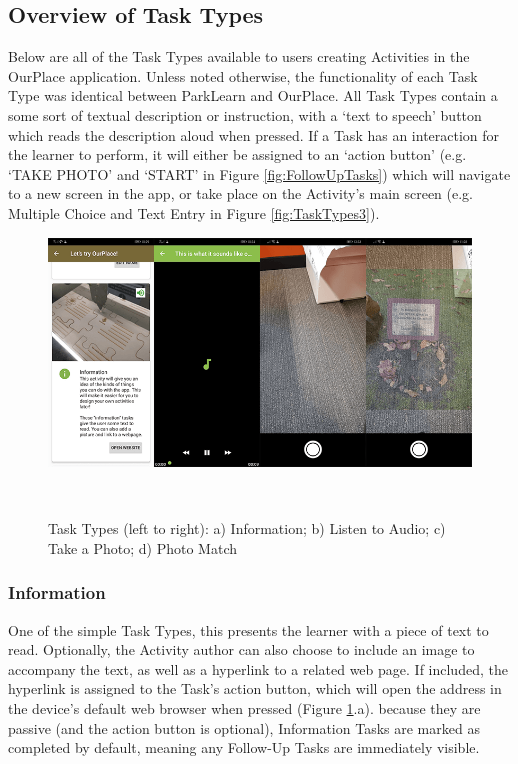 \subsection{Overview of Task Types}
\label{sec:TaskTypes}
Below are all of the Task Types available to users creating Activities in the OurPlace application. Unless noted otherwise, the functionality of each Task Type was identical between ParkLearn and OurPlace. All Task Types contain a some sort of textual description or instruction, with a `text to speech' button which reads the description aloud when pressed. If a Task has an interaction for the learner to perform, it will either be assigned to an `action button' (e.g. `TAKE PHOTO' and `START' in Figure \ref{fig:FollowUpTasks}) which will navigate to a new screen in the app, or take place on the Activity's main screen (e.g. Multiple Choice and Text Entry in Figure \ref{fig:TaskTypes3}). 

\begin{figure}
  \centering
  \includegraphics[width=1\columnwidth]{images/chapter05/tasktypes1.png}
  \caption[Task Types (part 1)]{Task Types (left to right): a) Information; b) Listen to Audio; c) Take a Photo; d) Photo Match}~\label{fig:TaskTypes1}
\end{figure}

\subsubsection*{Information}
One of the simple Task Types, this presents the learner with a piece of text to read. Optionally, the Activity author can also choose to include an image to accompany the text, as well as a hyperlink to a related web page. If included, the hyperlink is assigned to the Task's action button, which will open the address in the device's default web browser when pressed (Figure \ref{fig:TaskTypes1}.a). because they are passive (and the action button is optional), Information Tasks are marked as completed by default, meaning any Follow-Up Tasks are immediately visible.

